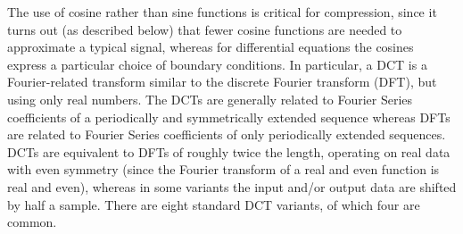 \documentclass[\documentfontsize, twocolumn]{\classname}
\begin{document}
The use of cosine rather than sine functions is critical for compression, since it turns out (as described below) that fewer cosine functions are needed to approximate a typical signal, whereas for differential equations the cosines express a particular choice of boundary conditions. In particular, a DCT is a Fourier-related transform similar to the discrete Fourier transform (DFT), but using only real numbers. The DCTs are generally related to Fourier Series coefficients of a periodically and symmetrically extended sequence whereas DFTs are related to Fourier Series coefficients of only periodically extended sequences. DCTs are equivalent to DFTs of roughly twice the length, operating on real data with even symmetry (since the Fourier transform of a real and even function is real and even), whereas in some variants the input and/or output data are shifted by half a sample. There are eight standard DCT variants, of which four are common\cite{bib:discreteCosineTransform}.
\end{document}

